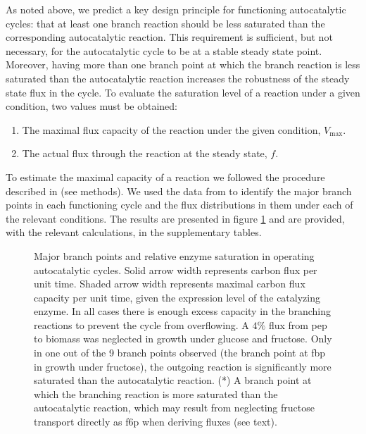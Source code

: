     As noted above, we predict a key design principle for functioning autocatalytic cycles: that at least one branch reaction should be less saturated than the corresponding autocatalytic reaction.
    This requirement is sufficient, but not necessary, for the autocatalytic cycle to be at a stable steady state point.
    Moreover, having more than one branch point at which the branch reaction is less saturated than the autocatalytic reaction increases the robustness of the steady state flux in the cycle.
    To evaluate the saturation level of a reaction under a given condition, two values must be obtained:
    \begin{enumerate}
      \item The maximal flux capacity of the reaction under the given condition, $V_{\max}$.
        \item The actual flux through the reaction at the steady state, $f$.
    \end{enumerate}

    To estimate the maximal capacity of a reaction we followed the procedure described in \cite{Davidi2016-ga} (see methods).
    We used the data from \cite{Gerosa2015-oq} to identify the major branch points in each functioning cycle and the flux distributions in them under each of the relevant conditions.
    The results are presented in figure \ref{fig:branch} and are provided, with the relevant calculations, in the supplementary tables.

\begin{figure}[!htb]
\centering
\resizebox{1\linewidth}{!}{
    
}
\caption{
  Major branch points and relative enzyme saturation in operating autocatalytic cycles.
  Solid arrow width represents carbon flux per unit time.
  Shaded arrow width represents maximal carbon flux capacity per unit time, given the expression level of the catalyzing enzyme.
  In all cases there is enough excess capacity in the branching reactions to prevent the cycle from overflowing.
  A $4\%$ flux from pep to biomass was neglected in growth under glucose and fructose.
  Only in one out of the 9 branch points observed (the branch point at fbp in growth under fructose), the outgoing reaction is significantly more saturated than the autocatalytic reaction.
  (*) A branch point at which the branching reaction is more saturated than the autocatalytic reaction, which may result from neglecting fructose transport directly as f6p when deriving fluxes (see text).
}
    \label{fig:branch}
\end{figure}


